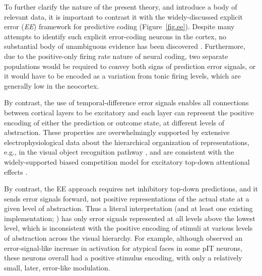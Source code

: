 \documentclass[11pt,twoside]{article}
\newif\myifpdf
\begin{document}
To further clarify the nature of the present theory, and introduce a body of relevant data, it is important to contrast it with the widely-discussed explicit error (\emph{EE}) framework for predictive coding \citep{RaoBallard99,KawatoHayakawaInui93,Friston05,Friston10,OudenKokLange12,BastosUsreyAdamsEtAl12,LotterKreimanCox16} (Figure~\ref{fig.ee}).  Despite many attempts to identify such explicit error-coding neurons in the cortex, no substantial body of unambiguous evidence has been discovered \citep{KokLange15,KokJeheedeLange12,SummerfieldEgner09,LeeMumford03,WalshMcGovernClarkEtAl20}.  Furthermore, due to the positive-only firing rate nature of neural coding, two separate populations would be required to convey both signs of prediction error signals, or it would have to be encoded as a variation from tonic firing levels, which are generally low in the neocortex.

By contrast, the use of temporal-difference error signals enables all connections between cortical layers to be excitatory and each layer can represent the positive encoding of either the prediction or outcome state, at different levels of abstraction.  These properties are overwhelmingly supported by extensive electrophysiological data about the hierarchical organization of representations, e.g., in the visual object recognition pathway \citep{KobatakeTanaka94,VanRullenThorpe02,CadieuHongYaminsEtAl14}, and are consistent with the widely-supported biased competition model for excitatory top-down attentional effects \citep{DesimoneDuncan95,ReynoldsChelazziDesimone99,MillerCohen01,OReillyWyatteHerdEtAl13}.

By contrast, the EE approach requires net inhibitory top-down predictions, and it sends error signals forward, not positive representations of the actual state at a given level of abstraction.  Thus a literal interpretation (and at least one existing implementation; \citealp{LotterKreimanCox16}) has only error signals represented at all levels above the lowest level, which is inconsistent with the positive encoding of stimuli at various levels of abstraction across the visual hierarchy.  For example, although \citet{IssaCadieuDiCarlo18} observed an error-signal-like increase in activation for atypical faces in some pIT neurons, these neurons overall had a positive stimulus encoding, with only a relatively small, later, error-like modulation.
\end{document}
